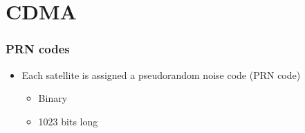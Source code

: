 \documentclass[aspectratio=169]{beamer}
\begin{document}
\section{CDMA}

\begin{frame}
  \frametitle{PRN codes}

  \begin{itemize}
    \item<2-> Each satellite is assigned a pseudorandom noise code (PRN code)
    
    \begin{itemize}
      \item<3-> Binary
      
      \item<4-> 1023 bits long
    \end{itemize}
  \end{itemize}

  \leavevmode \newline

\end{frame}
\end{document}
